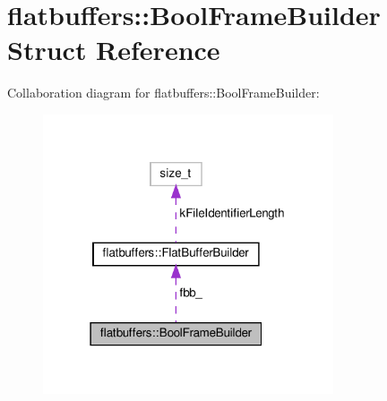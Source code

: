 \hypertarget{structflatbuffers_1_1BoolFrameBuilder}{}\section{flatbuffers\+:\+:Bool\+Frame\+Builder Struct Reference}
\label{structflatbuffers_1_1BoolFrameBuilder}


Collaboration diagram for flatbuffers\+:\+:Bool\+Frame\+Builder\+:
\nopagebreak
\begin{figure}[H]
\begin{center}
\leavevmode
\includegraphics[width=243pt]{structflatbuffers_1_1BoolFrameBuilder__coll__graph}
\end{center}
\end{figure}
